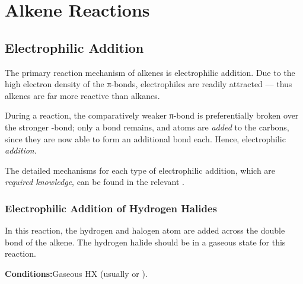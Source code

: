 



	\pagebreak
	\section{Alkene Reactions}

	\subsection{Electrophilic Addition}

		The primary reaction mechanism of alkenes is electrophilic addition. Due to the high electron density of the π-bonds,
		electrophiles are readily attracted –– thus alkenes are far more reactive than alkanes.

		During a reaction, the comparatively weaker π-bond is preferentially broken over the stronger \chemsigma-bond; only a
		 bond remains, and atoms are \textit{added} to the carbons, since they are now able to form an additional
		bond each. Hence, electrophilic \textit{addition}.

		The detailed mechanisms for each type of electrophilic addition, which are \textit{required knowledge}, can be found
		in the relevant \hyperlink{AddendumElectrophilicAddition}{}.

		\subsubsection{Electrophilic Addition of Hydrogen Halides}

			In this reaction, the hydrogen and halogen atom are added across the double bond of the alkene. The hydrogen halide
			should be in a gaseous state for this reaction.

			\vspace{1.5em}
			\vbox{\textbf{Conditions:}\tabto{35mm}Gaseous HX (usually  or ).}


